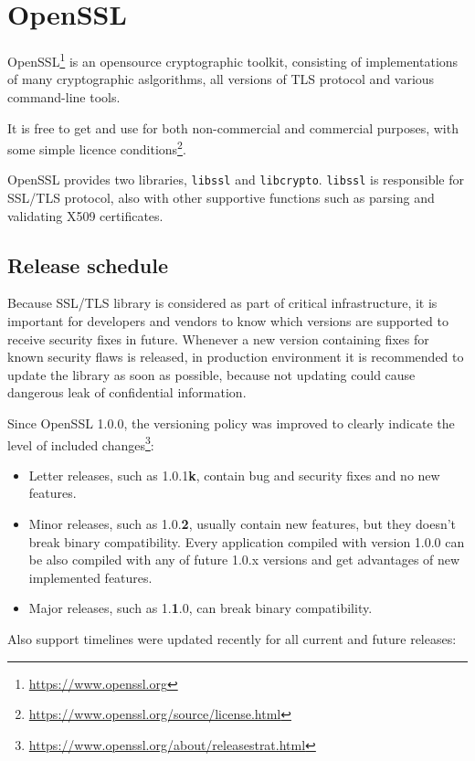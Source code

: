\chapter{OpenSSL}

OpenSSL\footnote{\url{https://www.openssl.org}} is an opensource cryptographic toolkit, consisting of implementations of many cryptographic aslgorithms, all versions of TLS protocol and various command-line tools.

It is free to get and use for both non-commercial and commercial purposes, with some simple licence conditions\footnote{\url{https://www.openssl.org/source/license.html}}.

OpenSSL provides two libraries, \texttt{libssl} and \texttt{libcrypto}. \texttt{libssl} is responsible for SSL/TLS protocol, also with other supportive functions such as parsing and validating X509 certificates.


\section{Release schedule}

Because SSL/TLS library is considered as part of critical infrastructure, it is important for developers and vendors to know which versions are supported to receive security fixes in future. Whenever a new version containing fixes for known security flaws is released, in production environment it is recommended to update the library as soon as possible, because not updating could cause dangerous leak of confidential information.

Since OpenSSL 1.0.0, the versioning policy was improved to clearly indicate the level of included changes\footnote{\url{https://www.openssl.org/about/releasestrat.html}}:

\begin{itemize}
  \item Letter releases, such as 1.0.1\textbf{k}, contain bug and security fixes and no new features.
  \item Minor releases, such as 1.0.\textbf{2}, usually contain new features, but they doesn't break binary compatibility. Every application compiled with version 1.0.0 can be also compiled with any of future 1.0.x versions and get advantages of new implemented features.
  \item Major releases, such as 1.\textbf{1}.0, can break binary compatibility.
\end{itemize}

Also support timelines were updated recently for all current and future releases:

